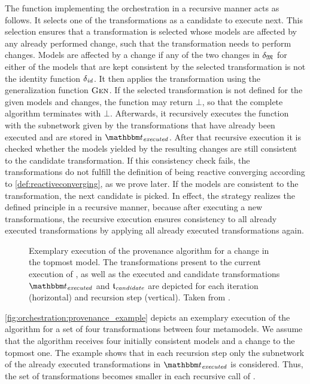 The function  implementing the orchestration in a recursive manner acts as follows.
It selects one of the transformations as a candidate to execute next.
This selection ensures that a transformation is selected whose models are affected by any already performed change, such that the transformation needs to perform changes.
Models are affected by a change if any of the two changes in $\change{\metamodeltuple{M}}$ for either of the models that are kept consistent by the selected transformation is not the identity function $\delta_{\mathit{id}}$.
It then applies the transformation using the generalization function $\textsc{Gen}_{}$.
If the selected transformation is not defined for the given models and changes, the function may return $\bot$, so that the complete algorithm terminates with $\bot$.
Afterwards, it recursively executes the function  with the subnetwork given by the transformations that have already been executed and are stored in $\provalgexecuted$.
After that recursive execution it is checked whether the models yielded by the resulting changes are still consistent to the candidate transformation.
If this consistency check fails, the transformations do not fulfill the definition of being reactive converging according to \autoref{def:reactiveconverging}, as we prove later.
If the models are consistent to the transformation, the next candidate is picked.
In effect, the strategy realizes the defined principle in a recursive manner, because after executing a new transformations, the recursive execution ensures consistency to all already executed transformations by applying all already executed transformations again.

\begin{figure}
    \centering
    
    \caption[Exemplary execution of the provenance algorithm]{%
    Exemplary execution of the provenance algorithm for a change in the topmost model. 
    The transformations present to the current execution of , as well as the executed and candidate transformations $\provalgexecuted$ and $\provalgcandidate$ are depicted for each iteration (horizontal) and recursion step (vertical). Taken from \cite{gleitze2020orchestration}.
}
    \label{fig:orchestration:provenance_example}
\end{figure}

\autoref{fig:orchestration:provenance_example} depicts an exemplary execution of the  algorithm for a set of four transformations between four metamodels.
We assume that the algorithm receives four initially consistent models and a change to the topmost one.
The example shows that in each recursion step only the subnetwork of the already executed transformations in $\provalgexecuted$ is considered.
Thus, the set of transformations becomes smaller in each recursive call of .


